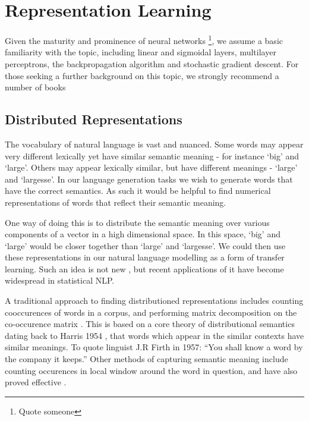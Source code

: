 \section{Representation Learning}

Given the maturity and prominence of neural networks \footnote{Quote someone}, we assume a basic familiarity with the topic, including linear and sigmoidal layers, multilayer perceptrons, the backpropagation algorithm and stochastic gradient descent. For those seeking a further background on this topic, we strongly recommend a number of books \cite{nielsenneural} \cite{Goodfellow:2016:DL:3086952} 



\subsection{Distributed Representations} %
\label{sub:embeddings}

The vocabulary of natural language is vast and nuanced. 
Some words may appear very different lexically yet have similar semantic meaning - for instance `big' and `large'.
Others may appear lexically similar, but have different meanings - `large' and `largesse'. 
In our language generation tasks we wish to generate words that have the correct semantics.
As such it would be helpful to find numerical representations of words that reflect their semantic meaning. 

One way of doing this is to distribute the semantic meaning over various components of a vector in a high dimensional space. In this space, `big' and `large' would be closer together than `large' and `largesse'. We could then use these representations in our natural language modelling as a form of transfer learning. Such an idea is not new \cite{hinton_distributed_nodate}, but recent applications of it have become widespread in statistical NLP. %

A traditional approach to finding distributioned representations includes counting cooccurences of words in a corpus, and performing matrix decomposition on the co-occurence matrix \cite{deerwester_indexing_1990}.  This is based on a core theory of distributional semantics dating back to Harris 1954 \cite{harris_distributional_1954}, that words which appear in the similar contexts have similar meanings. To quote linguist J.R Firth in 1957: ``You shall know a word by the company it keeps.'' \cite{Firth1957}
Other methods of capturing semantic meaning include counting occurences in local window around the word in question, and have also proved effective \cite{mikolov_efficient_2013}.

